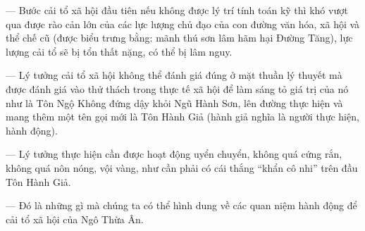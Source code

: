 — Bước cải tổ xã hội đầu tiên nếu không được lý trí tính toán kỹ thì khó vượt qua được rào cản lớn của các lực lượng chủ đạo của con đường văn hóa, xã hội và thể chế cũ (được biểu trưng bằng: mãnh thú sơn lâm hãm hại Đường Tăng), lực lượng cải tổ sẽ bị tổn thất nặng, có thể bị lâm nguy.

— Lý tưởng cải tổ xã hội không thể đánh giá đúng ở mặt thuần lý thuyết mà được đánh giá vào thử thách trong thực tế xã hội để làm sáng tỏ giá trị của nó như là Tôn Ngộ Không đứng dậy khỏi Ngũ Hành Sơn, lên đường thực hiện và mang thêm một tên gọi mới là Tôn Hành Giả (hành giả nghĩa là người thực hiện, hành động).

— Lý tưởng thực hiện cần được hoạt động uyển chuyển, không quá cứng rắn, không quá nôn nóng, vội vàng, như cần phải có cái thắng ``khẩn cô nhi'' trên đầu Tôn Hành Giả.

— Đó là những gì mà chúng ta có thể hình dung về các quan niệm hành động để cải tổ xã hội của Ngô Thừa Ân.
